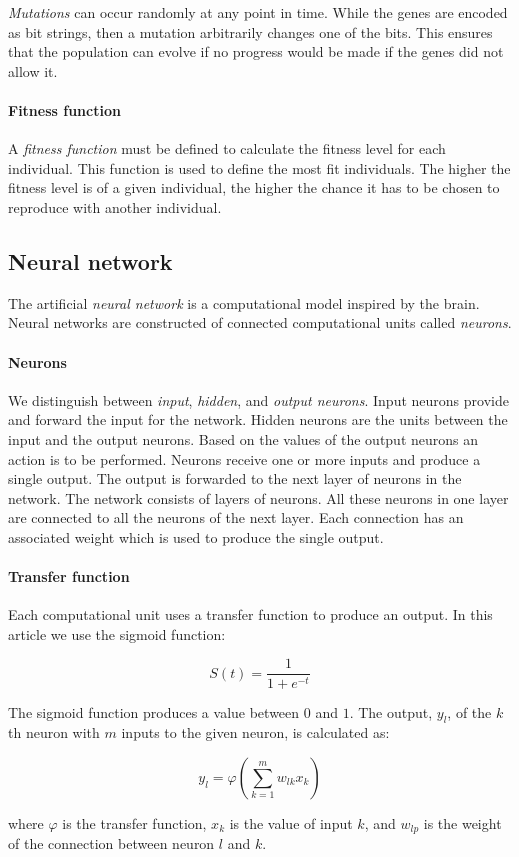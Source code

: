 
\emph{Mutations} can occur randomly at any point in time. While the genes are encoded as bit strings, then a mutation arbitrarily changes one of the bits. This ensures that the population can evolve if no progress would be made if the genes did not allow it.

\paragraph{Fitness function}

A \emph{fitness function} must be defined to calculate the fitness level for each individual. This function is used to define the most fit individuals. The higher the fitness level is of a given individual, the higher the chance it has to be chosen to reproduce with another individual.

\subsection{Neural network}

The artificial \emph{neural network} is a computational model inspired by the brain. Neural networks are constructed of connected computational units called \emph{neurons}.

\paragraph{Neurons}

We distinguish between \emph{input}, \emph{hidden}, and \emph{output neurons}. Input neurons provide and forward the input for the network. Hidden neurons are the units between the input and the output neurons. Based on the values of the output neurons an action is to be performed. Neurons receive one or more inputs and produce a single output. The output is forwarded to the next layer of neurons in the network.  The network consists of layers of neurons. All these neurons in one layer are connected to all the neurons of the next layer. Each connection has an associated weight which is used to produce the single output.

\paragraph{Transfer function}

Each computational unit uses a transfer function to produce an output. In this article we use the sigmoid function:

\[
    S(t) = \frac{1}{1+e^{-t}}
\]

The sigmoid function produces a value between $0$ and $1$. The output, $y_l$, of the $k$th neuron with $m$ inputs to the given neuron, is calculated as:

\[
    y_l = \varphi\left( \sum_{k=1}^m w_{lk} x_k \right)
\]

where $\varphi$ is the transfer function, $x_k$ is the value of input $k$, and $w_{l p}$ is the weight of the connection between neuron $l$ and $k$.
